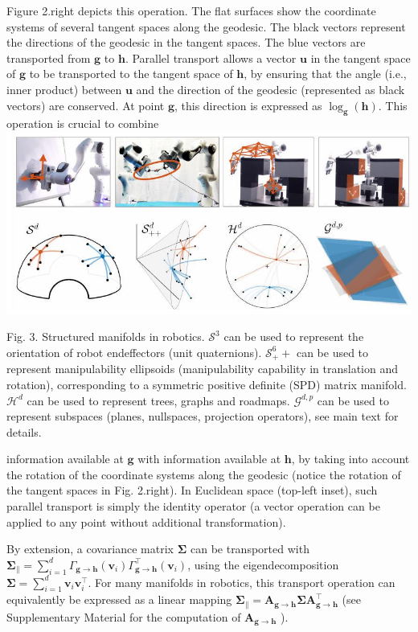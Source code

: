 \documentclass[10pt]{article}
\begin{document}
Figure 2.right depicts this operation. The flat surfaces show the coordinate systems of several tangent spaces along the geodesic. The black vectors represent the directions of the geodesic in the tangent spaces. The blue vectors are transported from $\boldsymbol{g}$ to $\boldsymbol{h}$. Parallel transport allows a vector $\boldsymbol{u}$ in the tangent space of $\boldsymbol{g}$ to be transported to the tangent space of $\boldsymbol{h}$, by ensuring that the angle (i.e., inner product) between $\boldsymbol{u}$ and the direction of the geodesic (represented as black vectors) are conserved. At point $\boldsymbol{g}$, this direction is expressed as $\log _{\boldsymbol{g}}(\boldsymbol{h})$. This operation is crucial to combine
\includegraphics[max width=\textwidth, center]{2023_01_25_b4240e152b7ba97a594cg-03}

Fig. 3. Structured manifolds in robotics. $\mathcal{S}^{3}$ can be used to represent the orientation of robot endeffectors (unit quaternions). $\mathcal{S}_{+}^{6}+$ can be used to represent manipulability ellipsoids (manipulability capability in translation and rotation), corresponding to a symmetric positive definite (SPD) matrix manifold. $\mathcal{H}^{d}$ can be used to represent trees, graphs and roadmaps. $\mathcal{G}^{d, p}$ can be used to represent subspaces (planes, nullspaces, projection operators), see main text for details.

information available at $\boldsymbol{g}$ with information available at $\boldsymbol{h}$, by taking into account the rotation of the coordinate systems along the geodesic (notice the rotation of the tangent spaces in Fig. 2.right). In Euclidean space (top-left inset), such parallel transport is simply the identity operator (a vector operation can be applied to any point without additional transformation).

By extension, a covariance matrix $\boldsymbol{\Sigma}$ can be transported with $\boldsymbol{\Sigma}_{\|}=\sum_{i=1}^{d} \Gamma_{\boldsymbol{g} \rightarrow \boldsymbol{h}}\left(\boldsymbol{v}_{i}\right) \Gamma_{\boldsymbol{g} \rightarrow \boldsymbol{h}}^{\top}\left(\boldsymbol{v}_{i}\right)$, using the eigendecomposition $\boldsymbol{\Sigma}=\sum_{i=1}^{d} \boldsymbol{v}_{i} \boldsymbol{v}_{i}^{\top}$. For many manifolds in robotics, this transport operation can equivalently be expressed as a linear mapping $\boldsymbol{\Sigma}_{\|}=\boldsymbol{A}_{\boldsymbol{g} \rightarrow \boldsymbol{h}} \boldsymbol{\Sigma} \boldsymbol{A}_{\boldsymbol{g} \rightarrow \boldsymbol{h}}^{\top}$ (see Supplementary Material for the computation of $\boldsymbol{A}_{\boldsymbol{g} \rightarrow \boldsymbol{h}}$ ).
\end{document}
